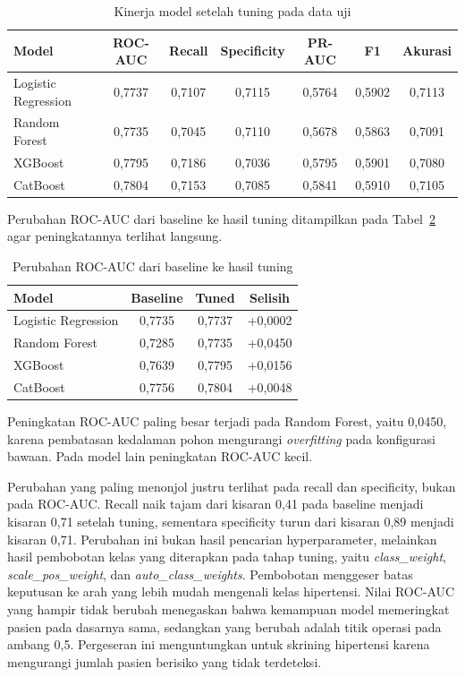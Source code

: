 \begin{table}[H]
\centering
\caption{Kinerja model setelah tuning pada data uji}
\label{tab:tuned}
\begin{tabular}{lcccccc}
\toprule
\textbf{Model} & \textbf{ROC-AUC} & \textbf{Recall} & \textbf{Specificity} & \textbf{PR-AUC} & \textbf{F1} & \textbf{Akurasi} \\
\midrule
Logistic Regression & 0,7737 & 0,7107 & 0,7115 & 0,5764 & 0,5902 & 0,7113 \\
Random Forest       & 0,7735 & 0,7045 & 0,7110 & 0,5678 & 0,5863 & 0,7091 \\
XGBoost             & 0,7795 & 0,7186 & 0,7036 & 0,5795 & 0,5901 & 0,7080 \\
CatBoost            & 0,7804 & 0,7153 & 0,7085 & 0,5841 & 0,5910 & 0,7105 \\
\bottomrule
\end{tabular}
\end{table}

Perubahan ROC-AUC dari baseline ke hasil tuning ditampilkan pada Tabel~\ref{tab:delta-auc} agar peningkatannya terlihat langsung.

\begin{table}[H]
\centering
\caption{Perubahan ROC-AUC dari baseline ke hasil tuning}
\label{tab:delta-auc}
\begin{tabular}{lccc}
\toprule
\textbf{Model} & \textbf{Baseline} & \textbf{Tuned} & \textbf{Selisih} \\
\midrule
Logistic Regression & 0,7735 & 0,7737 & +0,0002 \\
Random Forest       & 0,7285 & 0,7735 & +0,0450 \\
XGBoost             & 0,7639 & 0,7795 & +0,0156 \\
CatBoost            & 0,7756 & 0,7804 & +0,0048 \\
\bottomrule
\end{tabular}
\end{table}

Peningkatan ROC-AUC paling besar terjadi pada Random Forest, yaitu 0,0450, karena pembatasan kedalaman pohon mengurangi \emph{overfitting} pada konfigurasi bawaan. Pada model lain peningkatan ROC-AUC kecil.

Perubahan yang paling menonjol justru terlihat pada recall dan specificity, bukan pada ROC-AUC. Recall naik tajam dari kisaran 0,41 pada baseline menjadi kisaran 0,71 setelah tuning, sementara specificity turun dari kisaran 0,89 menjadi kisaran 0,71. Perubahan ini bukan hasil pencarian hyperparameter, melainkan hasil pembobotan kelas yang diterapkan pada tahap tuning, yaitu \textit{class\_weight}, \textit{scale\_pos\_weight}, dan \textit{auto\_class\_weights}. Pembobotan menggeser batas keputusan ke arah yang lebih mudah mengenali kelas hipertensi. Nilai ROC-AUC yang hampir tidak berubah menegaskan bahwa kemampuan model memeringkat pasien pada dasarnya sama, sedangkan yang berubah adalah titik operasi pada ambang 0,5. Pergeseran ini menguntungkan untuk skrining hipertensi karena mengurangi jumlah pasien berisiko yang tidak terdeteksi.

